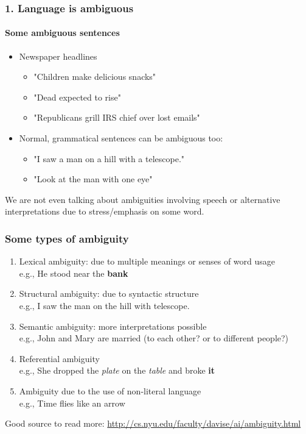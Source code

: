 \documentclass{beamer}
\begin{document}
\begin{frame}
\frametitle{1. Language is ambiguous}
\framesubtitle{Some ambiguous sentences}
\begin{itemize}
\item Newspaper headlines
\begin{itemize}
\item "Children make delicious snacks"
\item "Dead expected to rise"
\item "Republicans grill IRS chief over lost emails"
\end{itemize}
\item Normal, grammatical sentences can be ambiguous too:
\begin{itemize}
\item "I saw a man on a hill with a telescope."
\item "Look at the man with one eye"
\end{itemize}
\end{itemize}
We are not even talking about ambiguities involving speech or alternative interpretations due to stress/emphasis on some word.
\end{frame}

\begin{frame}
\frametitle{Some types of ambiguity}
\begin{enumerate}
\item Lexical ambiguity: due to multiple meanings or senses of word usage
\\ e.g., He stood near the \textbf{bank} \pause
\item Structural ambiguity: due to syntactic structure
\\ e.g., I saw the man on the hill with telescope. \pause
\item Semantic ambiguity: more interpretations possible
\\ e.g., John and Mary are married (to each other? or to different people?) \pause
\item Referential ambiguity
\\ e.g., She dropped the \textit{plate} on the \textit{table} and broke \textbf{it} \pause
\item Ambiguity due to the use of non-literal language
\\ e.g., Time flies like an arrow
\end{enumerate}
Good source to read more: \url{http://cs.nyu.edu/faculty/davise/ai/ambiguity.html}
\end{frame}
\end{document}
